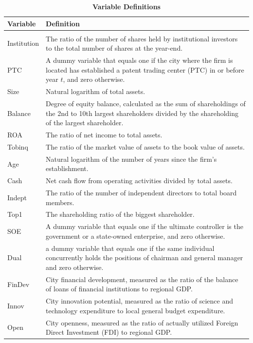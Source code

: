 \begin{table}[htbp]\centering\scriptsize
\def\sym#1{\ifmmode^{#1}\else\(^{#1}\)\fi}
\caption{\textbf{Variable Definitions}}
\label{definition}

\begin{tabular}{p{2.0cm}p{13.5cm}}
\toprule
Variable       &        Definition\\
\hline\\
Institution   & The ratio of the number of shares held by institutional investors to the total number of shares at the year-end.\\
PTC   & A dummy variable that equals one if the city where the firm is located has established a patent trading center (PTC) in or before year $t$, and zero otherwise.\\
Size   & Natural logarithm of total assets. \\
Balance   & Degree of equity balance, calculated as the sum of shareholdings of the 2nd to 10th largest shareholders divided by the shareholding of the largest shareholder. \\
ROA   & The ratio of net income to total assets. \\
Tobinq   & The ratio of the market value of assets to the book value of assets. \\
Age   & Natural logarithm of the number of years since the firm's establishment.\\
Cash   & Net cash flow from operating activities divided by total assets. \\
Indept   & The ratio of the number of independent directors to total board members. \\
Top1   & The shareholding ratio of the biggest shareholder. \\
SOE   & A dummy variable that equals one if the ultimate controller is the government or a state-owned enterprise, and zero otherwise. \\
Dual   & a dummy variable that equals one if the same individual concurrently holds the positions of chairman and general manager and zero otherwise. \\
FinDev   & City financial development, measured as the ratio of the balance of loans of financial institutions to regional GDP. \\
Innov   & City innovation potential, measured as the ratio of science and technology expenditure to local general budget expenditure. \\
Open   & City openness, measured as the ratio of actually utilized Foreign Direct Investment (FDI) to regional GDP. \\

\end{tabular}
\end{table}
